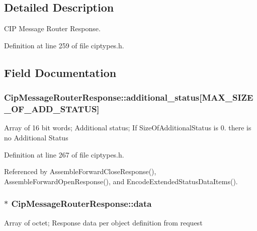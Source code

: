 \subsection{\-Detailed \-Description}
\-C\-I\-P \-Message \-Router \-Response. 



\-Definition at line 259 of file ciptypes.\-h.



\subsection{\-Field \-Documentation}
\hypertarget{structCipMessageRouterResponse_ab779a25335c5fe122f7f6a87edd1288d}{
\subsubsection[{additional\-\_\-status}]{ {\bf \-Cip\-Message\-Router\-Response\-::additional\-\_\-status}\mbox{[}{\bf \-M\-A\-X\-\_\-\-S\-I\-Z\-E\-\_\-\-O\-F\-\_\-\-A\-D\-D\-\_\-\-S\-T\-A\-T\-U\-S}\mbox{]}}}\label{d0/d1f/structCipMessageRouterResponse_ab779a25335c5fe122f7f6a87edd1288d}
\-Array of 16 bit words; \-Additional status; \-If \-Size\-Of\-Additional\-Status is 0. there is no \-Additional \-Status 

\-Definition at line 267 of file ciptypes.\-h.



\-Referenced by \-Assemble\-Forward\-Close\-Response(), \-Assemble\-Forward\-Open\-Response(), and \-Encode\-Extended\-Status\-Data\-Items().

\hypertarget{structCipMessageRouterResponse_a20feba97168b4551ba1e483e9cf568ec}{
\subsubsection[{data}]{$\ast$ {\bf \-Cip\-Message\-Router\-Response\-::data}}}\label{d0/d1f/structCipMessageRouterResponse_a20feba97168b4551ba1e483e9cf568ec}
\-Array of octet; \-Response data per object definition from request 

